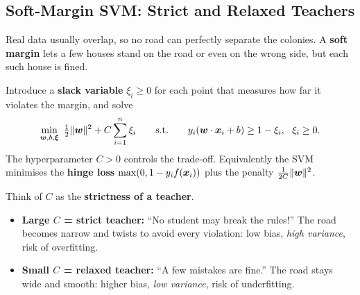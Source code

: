 \subsection{Soft-Margin SVM: Strict and Relaxed Teachers}

Real data usually overlap, so no road can perfectly separate the colonies. A \textbf{soft margin} lets a few houses stand on the road or even on the wrong side, but each such house is fined.

\begin{definition}
Introduce a \textbf{slack variable} $\xi_i\ge0$ for each point that measures how far it violates the margin, and solve
\[
  \min_{\boldsymbol{w},b,\boldsymbol{\xi}}\ \tfrac12\|\boldsymbol{w}\|^2+C\sum_{i=1}^{n}\xi_i\qquad\text{s.t.}\qquad y_i(\boldsymbol{w}\cdot\boldsymbol{x}_i+b)\ge1-\xi_i,\ \ \xi_i\ge0 .
\]
The hyperparameter $C>0$ controls the trade-off. Equivalently the SVM minimises the \textbf{hinge loss} $\max(0,1-y_if(\boldsymbol{x}_i))$ plus the penalty $\frac1{2C}\|\boldsymbol{w}\|^2$.
\end{definition}

Think of $C$ as the \textbf{strictness of a teacher}.

\begin{itemize}
  \item \textbf{Large $C$ = strict teacher:} ``No student may break the rules!'' The road becomes narrow and twists to avoid every violation: low bias, \emph{high variance}, risk of overfitting.
  \item \textbf{Small $C$ = relaxed teacher:} ``A few mistakes are fine.'' The road stays wide and smooth: higher bias, \emph{low variance}, risk of underfitting.
\end{itemize}

